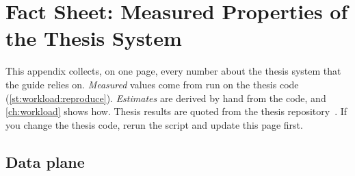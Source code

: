 \chapter{Fact Sheet: Measured Properties of the Thesis System}\label{app:factsheet}

This appendix collects, on one page, every number about the thesis system that
the guide relies on. \emph{Measured} values come from
 run on the thesis code
(\cref{st:workload:reproduce}). \emph{Estimates} are derived by hand from the
code, and \cref{ch:workload} shows how. Thesis results are quoted from the
thesis repository~\cite{burrell2026thesis}. If you change the thesis code, rerun
the script and update this page first.

\section*{Data plane}

